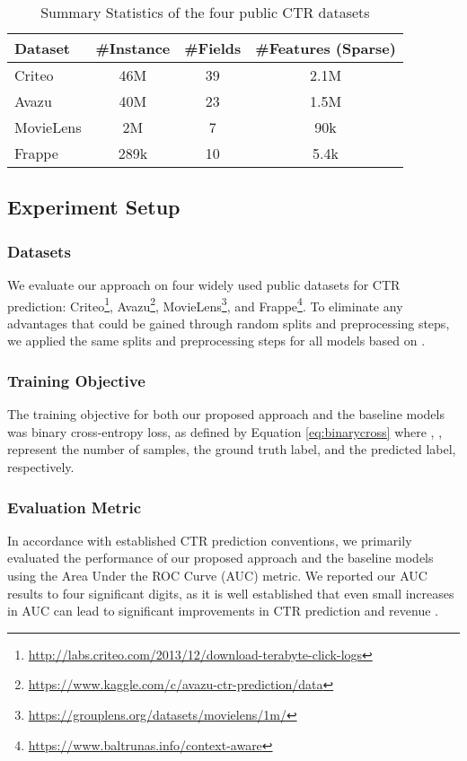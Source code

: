 \documentclass{article}
\begin{document}
\begin{table}[h]
\centering
\caption{Summary Statistics of the four public CTR datasets}
\label{table:datasets}
\begin{tabular}{@{}l|c|c|c@{}}
\toprule
Dataset      & \#Instance & \#Fields & \#Features (Sparse) \\ \midrule
Criteo       &  46M         & 39        & 2.1M                   \\
Avazu        & 40M         & 23        & 1.5M                   \\
MovieLens    & 2M          & 7        & 90k                   \\
Frappe       & 289k          & 10        & 5.4k                   \\ \bottomrule
\end{tabular}
\end{table}

\subsection{Experiment Setup}

\subsubsection{Datasets}

We evaluate our approach on four widely used public datasets for CTR prediction: Criteo\footnote{\url{http://labs.criteo.com/2013/12/download-terabyte-click-logs}}, Avazu\footnote{\url{https://www.kaggle.com/c/avazu-ctr-prediction/data}}, MovieLens\footnote{\url{https://grouplens.org/datasets/movielens/1m/}}, and Frappe\footnote{\url{https://www.baltrunas.info/context-aware}}. To eliminate any advantages that could be gained through random splits and preprocessing steps, we applied the same splits and preprocessing steps for all models based on \cite{cheng2020adaptive}.

\subsubsection{Training Objective}

The training objective for both our proposed approach and the baseline models was binary cross-entropy loss, as defined by Equation \ref{eq:binarycross} where , ,   represent the number of samples, the ground truth label, and the predicted label, respectively.



\subsubsection{Evaluation Metric}
In accordance with established CTR prediction conventions, we primarily evaluated the performance of our proposed approach and the baseline models using the Area Under the ROC Curve (AUC) metric. We reported our AUC results to four significant digits, as it is well established that even small increases in AUC can lead to significant improvements in CTR prediction and revenue \cite{cheng2016wide}.
\end{document}
